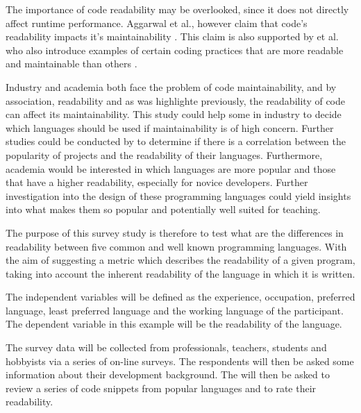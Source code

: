 \documentclass[times, 10pt,twocolumn]{IEEEtran}
\begin{document}
The importance of code readability may be overlooked, since it does not directly affect runtime performance. Aggarwal et al., however claim that code's readability impacts it's maintainability \cite{aggarwal2002integrated}. This claim is also supported by \cite{elshoff1982improving} et al. who also introduce examples of certain coding practices that are more readable and maintainable than others \cite{elshoff1982improving}.




Industry and academia both face the problem of code maintainability, and by association, readability and as was highlighte previously, the readability of code can affect its maintainability. This study could help some in industry to decide which languages should be used if maintainability is of high concern. Further studies could be conducted by to determine if there is a correlation between the popularity of projects and the readability of their languages. Furthermore, academia would be interested in which languages are more popular and those that have a higher readability, especially for novice developers. Further investigation into the design of these programming languages could yield insights into what makes them so popular and potentially well suited for teaching.
\newline

The purpose of this survey study is therefore to test what are the differences in readability between five common and well known programming languages. With the aim of suggesting a metric which describes the readability of a given program, taking into account the inherent readability of the language in which it is written.
\newline

The independent variables will be defined as the experience, occupation, preferred language, least preferred language and the working language of the participant. The dependent variable in this example will be the readability of the language.
\newline

The survey data will be collected from professionals, teachers, students and hobbyists via a series of on-line surveys. The respondents will then be asked some information about their development background. The will then be asked to review a series of code snippets from popular languages and to rate their readability. 
\newline
\end{document}
